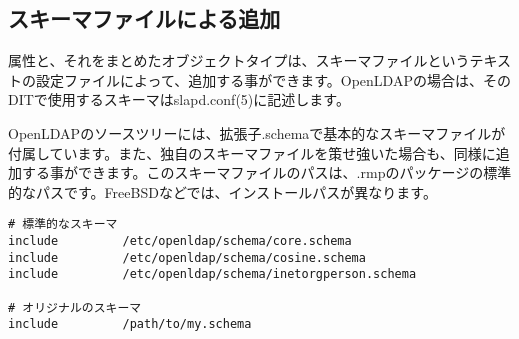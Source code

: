 \subsection{スキーマファイルによる追加}

属性と、それをまとめたオブジェクトタイプは、スキーマファイルというテキストの設定ファイルによって、追加する事ができます。OpenLDAPの場合は、そのDITで使用するスキーマはslapd.conf(5)に記述します。

OpenLDAPのソースツリーには、拡張子.schemaで基本的なスキーマファイルが付属しています。また、独自のスキーマファイルを策せ強いた場合も、同様に追加する事ができます。このスキーマファイルのパスは、.rmpのパッケージの標準的なパスです。FreeBSDなどでは、インストールパスが異なります。

\begin{verbatim}
# 標準的なスキーマ
include         /etc/openldap/schema/core.schema
include         /etc/openldap/schema/cosine.schema
include         /etc/openldap/schema/inetorgperson.schema

# オリジナルのスキーマ
include         /path/to/my.schema
\end{verbatim}

